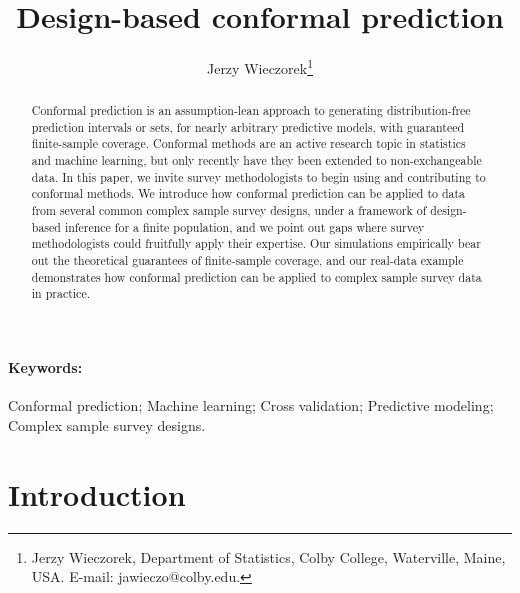 \documentclass[10.5pt, letterpaper]{article}
\numberwithin{table}{section}
\numberwithin{figure}{section}
\numberwithin{equation}{section}
\begin{document}
\title{Design-based conformal prediction}
\author{Jerzy Wieczorek\footnote{Jerzy Wieczorek, Department of Statistics, Colby College, Waterville, Maine, USA. E-mail: jawieczo@colby.edu.}}

\maketitle

\doublespacing

\begin{abstract}
Conformal prediction is an assumption-lean approach to generating distribution-free prediction intervals or sets, for nearly arbitrary predictive models, with guaranteed finite-sample coverage.
Conformal methods are an active research topic in statistics and machine learning, but only recently have they been extended to non-exchangeable data. In this paper, we invite survey methodologists to begin using and contributing to conformal methods. We introduce how conformal prediction can be applied to data from several common complex sample survey designs, under a framework of design-based inference for a finite population, and we point out gaps where survey methodologists could fruitfully apply their expertise. Our simulations empirically bear out the theoretical guarantees of finite-sample coverage, and our real-data example demonstrates how conformal prediction can be applied to complex sample survey data in practice.
\end{abstract}

\paragraph{Keywords:}
Conformal prediction; Machine learning; Cross validation; Predictive modeling;
Complex sample survey designs.


\section{Introduction}\label{sec:Introduction}

\end{document}
